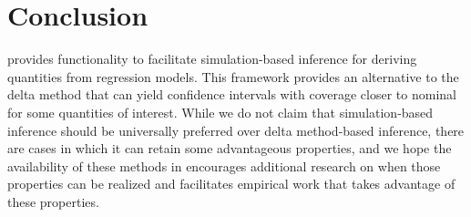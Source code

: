 \section{Conclusion}\label{conclusion}
 provides functionality to facilitate simulation-based inference for deriving quantities from regression models. This framework provides an alternative to the delta method that can yield confidence intervals with coverage closer to nominal for some quantities of interest. While we do not claim that simulation-based inference should be universally preferred over delta method-based inference, there are cases in which it can retain some advantageous properties, and we hope the availability of these methods in  encourages additional research on when those properties can be realized and facilitates empirical work that takes advantage of these properties.

\address{%
Noah Greifer\\
Harvard University\\%
Institute for Quantitative Social Science\\ Cambridge, MA\\
%
ngreifer.github.io\\%
\textit{ORCiD: \href{https://orcid.org/0000-0003-3067-7154}{0000-0003-3067-7154}}\\%
\href{mailto:ngreifer@iq.harvard.edu}{\nolinkurl{ngreifer@iq.harvard.edu}}%
}
\address{%
Steven Worthington\\
Harvard University\\%
Institute for Quantitative Social Science\\ Cambridge, MA\\
%
%
\textit{ORCiD: \href{https://orcid.org/0000-0001-9550-5797}{0000-0001-9550-5797}}\\%
\href{mailto:sworthington@iq.harvard.edu}{\nolinkurl{sworthington@iq.harvard.edu}}%
}
\address{%
Stefano Iacus\\
Harvard University\\%
Institute for Quantitative Social Science\\ Cambridge, MA\\
%
%
\textit{ORCiD: \href{https://orcid.org/0000-0002-4884-0047}{0000-0002-4884-0047}}\\%
\href{mailto:siacus@iq.harvard.edu}{\nolinkurl{siacus@iq.harvard.edu}}%
}
\address{%
Gary King\\
Harvard University\\%
Institute for Quantitative Social Science\\ Cambridge, MA\\
%
%
\textit{ORCiD: \href{https://orcid.org/0000-0002-5327-7631}{0000-0002-5327-7631}}\\%
\href{mailto:king@harvard.edu}{\nolinkurl{king@harvard.edu}}%
}

